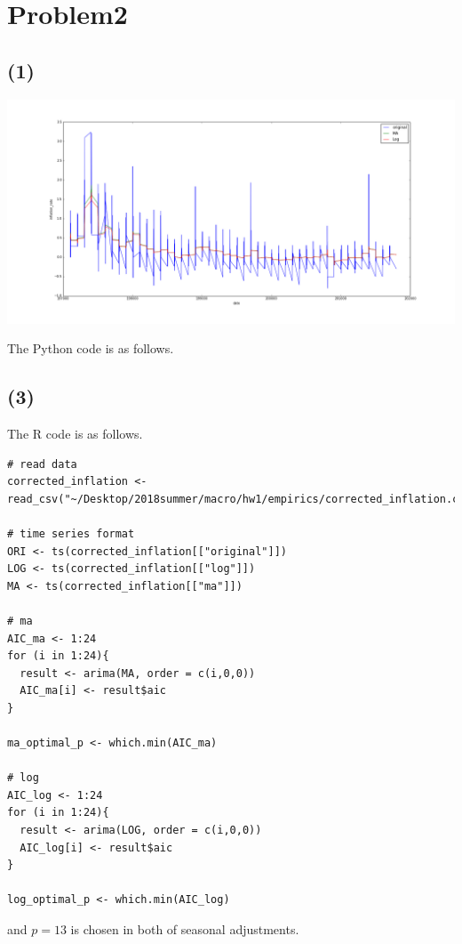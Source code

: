 \documentclass{article}
\begin{document}
\section{Problem2}
\subsection{(1)}
\includegraphics[width = 15cm]{inflation.png}

The Python code is as follows.


\subsection{(3)}
The R code is as follows.
\begin{lstlisting}
# read data
corrected_inflation <- read_csv("~/Desktop/2018summer/macro/hw1/empirics/corrected_inflation.csv")

# time series format
ORI <- ts(corrected_inflation[["original"]])
LOG <- ts(corrected_inflation[["log"]])
MA <- ts(corrected_inflation[["ma"]])

# ma
AIC_ma <- 1:24
for (i in 1:24){
  result <- arima(MA, order = c(i,0,0))
  AIC_ma[i] <- result$aic
}

ma_optimal_p <- which.min(AIC_ma)

# log
AIC_log <- 1:24
for (i in 1:24){
  result <- arima(LOG, order = c(i,0,0))
  AIC_log[i] <- result$aic
}

log_optimal_p <- which.min(AIC_log)
\end{lstlisting}
and $p = 13$ is chosen in both of seasonal adjustments. 
\end{document}
